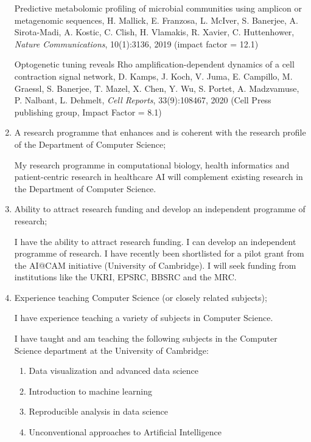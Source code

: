 \documentclass[10pt]{article}
\begin{document}
\begin{enumerate}
Predictive metabolomic profiling of microbial communities using amplicon or metagenomic sequences, H. Mallick, E. Franzosa, L. McIver, S. Banerjee, A. Sirota-Madi, A. Kostic, C. Clish, H. Vlamakis, R. Xavier, C. Huttenhower, \textit{Nature Communications}, 10(1):3136, 2019 (impact factor = 12.1)

Optogenetic tuning reveals Rho amplification-dependent dynamics of a cell contraction signal
network, D. Kamps, J. Koch, V. Juma, E. Campillo, M. Graessl, S. Banerjee, T. Mazel, X. Chen, Y.
Wu, S. Portet, A. Madzvamuse, P. Nalbant, L. Dehmelt, \textit{Cell Reports}, 33(9):108467, 2020 (Cell
Press publishing group, Impact Factor = 8.1)



\item A research programme that enhances and is coherent with the research profile of the Department
of Computer Science;

My research programme in computational biology, health informatics and patient-centric research in healthcare AI will complement existing research in the Department of Computer Science.

\item Ability to attract research funding and develop an independent programme of research;

I have the ability to attract research funding. I can develop an independent programme of research. I have recently been shortlisted for a pilot grant from the AI@CAM initiative (University of Cambridge). I will seek funding from institutions like the UKRI, EPSRC, BBSRC and the MRC.

\item Experience teaching Computer Science (or closely related subjects);

I have experience teaching a variety of subjects in Computer Science.

I have taught and am teaching the following subjects in the Computer Science department at the University of Cambridge:

\begin{enumerate}
	\item Data visualization and advanced data science
	\item Introduction to machine learning
	\item Reproducible analysis in data science
	\item Unconventional approaches to Artificial Intelligence
\end{enumerate}


\end{enumerate}
\end{document}
